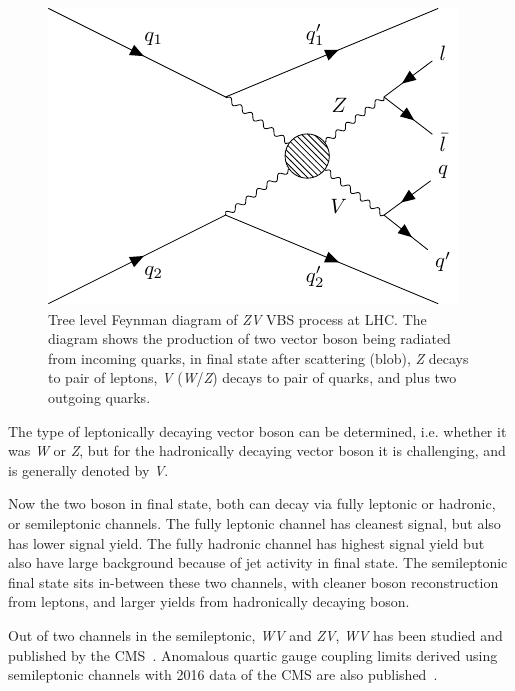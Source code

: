 \begin{figure}[!ht]
  \centering
  \begin{minipage}{0.5\textwidth}
    \includegraphics[width=\textwidth]{figures/feyn_vbs_0.pdf}
    \vspace{5pt}
  \end{minipage}
  \caption[Tree level Feynman diagram of \textit{ZV} VBS process at LHC]%
  {Tree level Feynman diagram of \textit{ZV} VBS process at LHC\@. The diagram
    shows the production of two vector boson being radiated from incoming
    quarks, in final state after scattering (blob), \textit{Z} decays
    to pair of leptons, \textit{V} (\textit{W}/\textit{Z}) decays to pair of quarks,
    and plus two outgoing quarks.
  }%
  \label{fig:feynman-vbs}
\end{figure}

The type of leptonically decaying
vector boson can be determined, i.e.
whether it was \textit{W} or \textit{Z},
but for the hadronically decaying vector
boson it is challenging, and is generally denoted by \textit{V}.

Now the two boson
in final state, both can decay via fully leptonic or hadronic,
or semileptonic channels.
The fully leptonic channel has cleanest signal, but also has
lower signal yield. The fully hadronic channel has highest
signal yield but also have large background because of jet activity
in final state.
The semileptonic final state sits in-between these two channels,
with cleaner boson reconstruction from leptons, and larger yields
from hadronically decaying boson.

Out of two channels in the semileptonic, \textit{WV} and \textit{ZV},
\textit{WV} has been studied and published by the \gls{CMS}~\cite{vbs-wv-cms-2021}.
Anomalous quartic gauge coupling limits derived using semileptonic
channels with 2016 data of the \gls{CMS} are also published~\cite{wv-vbs-aqgc}.


